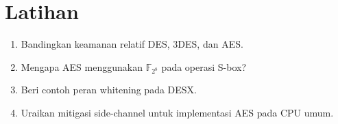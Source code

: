 \documentclass[../main.tex]{subfiles}
\begin{document}
\section{Latihan}
\begin{enumerate}
  \item Bandingkan keamanan relatif DES, 3DES, dan AES.
  \item Mengapa AES menggunakan \(\mathbb{F}_{2^8}\) pada operasi S-box?
  \item Beri contoh peran whitening pada DESX.
  \item Uraikan mitigasi side-channel untuk implementasi AES pada CPU umum.
\end{enumerate}
\end{document}
